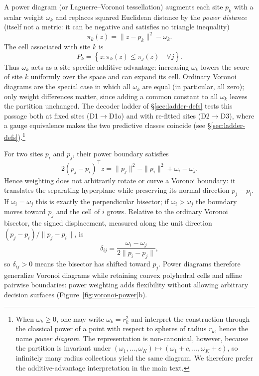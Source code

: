 \documentclass[11pt]{article}
\begin{document}
A power diagram (or Laguerre--Voronoi tessellation) \citep{aurenhammer1987power} augments each site $p_k$ with a scalar weight $\omega_k$ and replaces squared Euclidean distance by the \emph{power distance} (itself not a metric: it can be negative and satisfies no triangle inequality)
\begin{equation}
\pi_k(z)=\|z-p_k\|^2-\omega_k. \label{eq:powerdist}
\end{equation}
The cell associated with site $k$ is
\begin{equation}
P_k=\left\{z:\pi_k(z)\leq\pi_j(z)\quad\forall j\right\}. \label{eq:powcell}
\end{equation}
Thus $\omega_k$ acts as a site-specific additive advantage: increasing $\omega_k$ lowers the score of site $k$ uniformly over the space and can expand its cell. Ordinary Voronoi diagrams are the special case in which all $\omega_k$ are equal (in particular, all zero); only weight differences matter, since adding a common constant to all $\omega_k$ leaves the partition unchanged. The decoder ladder of \S\ref{sec:ladder-defs} tests this passage both at fixed sites (D1$\to$D1o) and with re-fitted sites (D2$\to$D3), where a gauge equivalence makes the two predictive classes coincide (see \S\ref{sec:ladder-defs}).\footnote{When $\omega_k\geq0$, one may write $\omega_k=r_k^2$ and interpret the construction through the classical power of a point with respect to spheres of radius $r_k$, hence the name \emph{power diagram}. The representation is non-canonical, however, because the partition is invariant under $(\omega_1,\dots,\omega_K)\mapsto(\omega_1+c,\dots,\omega_K+c)$, so infinitely many radius collections yield the same diagram. We therefore prefer the additive-advantage interpretation in the main text.}

For two sites $p_i$ and $p_j$, their power boundary satisfies
\begin{equation}
2(p_j-p_i)^\top z=\|p_j\|^2-\|p_i\|^2+\omega_i-\omega_j. \label{eq:pairwise}
\end{equation}
Hence weighting does not arbitrarily rotate or curve a Voronoi boundary: it translates the separating hyperplane while preserving its normal direction $p_j-p_i$. If $\omega_i=\omega_j$ this is exactly the perpendicular bisector; if $\omega_i>\omega_j$ the boundary moves toward $p_j$ and the cell of $i$ grows. Relative to the ordinary Voronoi bisector, the signed displacement, measured along the unit direction $(p_j-p_i)/\|p_j-p_i\|$, is
\begin{equation}
\delta_{ij}=\frac{\omega_i-\omega_j}{2\|p_i-p_j\|}, \label{eq:disp}
\end{equation}
so $\delta_{ij}>0$ means the bisector has shifted toward $p_j$.
Power diagrams therefore generalize Voronoi diagrams while retaining convex polyhedral cells and affine pairwise boundaries: power weighting adds flexibility without allowing arbitrary decision surfaces (Figure~\ref{fig:voronoi-power}b).
\end{document}

